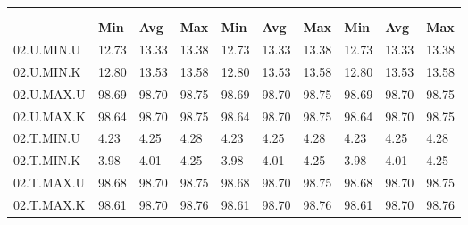 \begin{tabular}{|>{\raggedright}p{}|>{\raggedright}p{}|>{\raggedright}p{}|>{\raggedright}p{}|>{\raggedright}p{}|>{\raggedright}p{}|>{\raggedright}p{}|>{\raggedright}p{}|>{\raggedright}p{}|>{\raggedright}p{}|}
\hline 
\multirow{3}{0.12\columnwidth}{\textbf{\footnotesize{}Bezeichnung}} & \multicolumn{9}{l|}{\textbf{\footnotesize{}RX-Bitrate {[}MBit/s{]}}}\tabularnewline
\cline{2-10} 
& \multicolumn{3}{l|}{\textbf{\footnotesize{}prp1}} & \multicolumn{3}{l|}{\textbf{\footnotesize{}eth0}} & \multicolumn{3}{l|}{\textbf{\footnotesize{}eth1}}\tabularnewline
\cline{2-10} 
& \textbf{\footnotesize{}Min} & \textbf{\footnotesize{}Avg} & \textbf{\footnotesize{}Max} & \textbf{\footnotesize{}Min} & \textbf{\footnotesize{}Avg} & \textbf{\footnotesize{}Max} & \textbf{\footnotesize{}Min} & \textbf{\footnotesize{}Avg} & \textbf{\footnotesize{}Max}\tabularnewline
\hline 
\hline 
{\footnotesize{}02.U.MIN.U} & {\footnotesize{}12.73} & {\footnotesize{}13.33} & {\footnotesize{}13.38} & {\footnotesize{}12.73} & {\footnotesize{}13.33} & {\footnotesize{}13.38} & {\footnotesize{}12.73} & {\footnotesize{}13.33} & {\footnotesize{}13.38}\tabularnewline
\hline 
\hline 
{\footnotesize{}02.U.MIN.K} & {\footnotesize{}12.80} & {\footnotesize{}13.53} & {\footnotesize{}13.58} & {\footnotesize{}12.80} & {\footnotesize{}13.53} & {\footnotesize{}13.58} & {\footnotesize{}12.80} & {\footnotesize{}13.53} & {\footnotesize{}13.58}\tabularnewline
\hline 
\hline 
{\footnotesize{}02.U.MAX.U} & {\footnotesize{}98.69} & {\footnotesize{}98.70} & {\footnotesize{}98.75} & {\footnotesize{}98.69} & {\footnotesize{}98.70} & {\footnotesize{}98.75} & {\footnotesize{}98.69} & {\footnotesize{}98.70} & {\footnotesize{}98.75}\tabularnewline
\hline 
\hline 
{\footnotesize{}02.U.MAX.K} & {\footnotesize{}98.64} & {\footnotesize{}98.70} & {\footnotesize{}98.75} & {\footnotesize{}98.64} & {\footnotesize{}98.70} & {\footnotesize{}98.75} & {\footnotesize{}98.64} & {\footnotesize{}98.70} & {\footnotesize{}98.75}\tabularnewline
\hline 
\hline 
{\footnotesize{}02.T.MIN.U} & {\footnotesize{}4.23} & {\footnotesize{}4.25} & {\footnotesize{}4.28} & {\footnotesize{}4.23} & {\footnotesize{}4.25} & {\footnotesize{}4.28} & {\footnotesize{}4.23} & {\footnotesize{}4.25} & {\footnotesize{}4.28}\tabularnewline
\hline 
\hline 
{\footnotesize{}02.T.MIN.K} & {\footnotesize{}3.98} & {\footnotesize{}4.01} & {\footnotesize{}4.25} & {\footnotesize{}3.98} & {\footnotesize{}4.01} & {\footnotesize{}4.25} & {\footnotesize{}3.98} & {\footnotesize{}4.01} & {\footnotesize{}4.25}\tabularnewline
\hline 
\hline 
{\footnotesize{}02.T.MAX.U} & {\footnotesize{}98.68} & {\footnotesize{}98.70} & {\footnotesize{}98.75} & {\footnotesize{}98.68} & {\footnotesize{}98.70} & {\footnotesize{}98.75} & {\footnotesize{}98.68} & {\footnotesize{}98.70} & {\footnotesize{}98.75}\tabularnewline
\hline 
\hline 
{\footnotesize{}02.T.MAX.K} & {\footnotesize{}98.61} & {\footnotesize{}98.70} & {\footnotesize{}98.76} & {\footnotesize{}98.61} & {\footnotesize{}98.70} & {\footnotesize{}98.76} & {\footnotesize{}98.61} & {\footnotesize{}98.70} & {\footnotesize{}98.76}\tabularnewline
\hline 
\end{tabular}
\par
